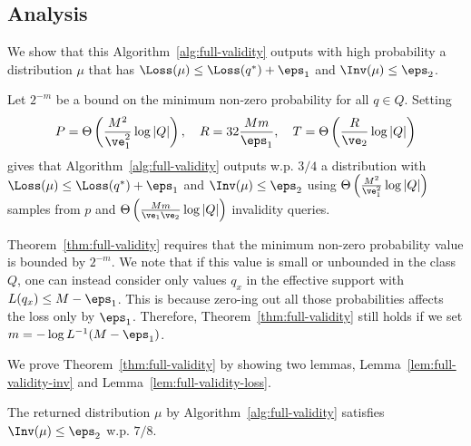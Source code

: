 \subsection{Analysis}

We show that this Algorithm~\ref{alg:full-validity} outputs with high probability a distribution $\mu$ that has $\Loss(\mu) \le \Loss(q^*) + \eps_1$ and $\Inv(\mu) \le \eps_2$. 

\begin{theorem}\label{thm:full-validity}
  Let $2^{-m}$ be a bound on the minimum non-zero probability for all $q \in Q$. 
  Setting
  \begin{equation}
    P=\Theta\left(\frac{M^2}{\ve_1^2} \log |Q| \right), \quad R = 32 \frac { M m } {\eps_1}, \quad  T = \Theta\left(\frac{R}{\ve_2} \log |Q| \right)
    \end{equation}
  gives that Algorithm~\ref{alg:full-validity} outputs w.p. $3/4$ a distribution with $\Loss(\mu) \le \Loss(q^*) + \eps_1$ and $\Inv(\mu) \le \eps_2$ using $\Theta\left(\frac{M^2}{\ve_1^2} \log |Q| \right)$ samples from $p$ and $\Theta\left(\frac{M m}{ \ve_1 \ve_2} \log |Q|\right)$ invalidity queries.
\end{theorem}


Theorem~\ref{thm:full-validity} requires that the minimum non-zero probability value is bounded by $2^{-m}$. We note that if this value is small or unbounded in the class $Q$, one can instead consider only values $q_x$ in the effective support with $L(q_x) \le M - \eps_1$. This is because zero-ing out all those probabilities affects the loss only by $\eps_1$. Therefore, Theorem~\ref{thm:full-validity} still holds if we set $m = -\log L^{-1}(M-\eps_1)$.

We prove Theorem~\ref{thm:full-validity} by showing two lemmas, Lemma~\ref{lem:full-validity-inv} and Lemma~\ref{lem:full-validity-loss}.

\begin{lemma}\label{lem:full-validity-inv}
The returned distribution $\mu$ by Algorithm~\ref{alg:full-validity} satisfies $\Inv(\mu) \le \eps_2$ w.p. $7/8$.
\end{lemma}


